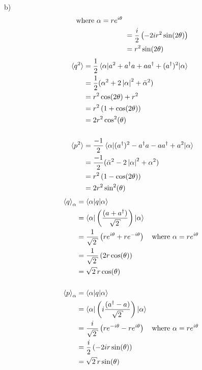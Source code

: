 \begin{homeworkProblem}[Problem 10]
\begin{homeworkSection}{b)}
\begin{align}
\text{\quad where $\alpha = r e^{i \theta}$ } \\
&= \frac{i}{2} \left( -2 i r^2 \sin(2\theta) \right) \\
&= r^{2} \sin(2\theta)
\end{align}
\begin{align}
   \braket{q^2} &= \frac{1}{2}
   \braket{\alpha |
   a^{2} + a^{\dagger}a + aa^{\dagger} + (a^{\dagger})^{2} | \alpha } \\
   &= \frac{1}{2}(\alpha^{2} + 2 \left| \alpha \right|^{2} + \bar{\alpha}^2 )\\
   &= r^{2} \cos(2\theta) + r^{2} \\
   &= r^{2} \left( 1 + \cos(2\theta) \right) \\
   &= 2 r^{2} \cos^{2}(\theta) \\ \nonumber \\
   \braket{p^2}
   &= \frac{-1}{2}
   \braket{\alpha |
   (a^\dagger)^{2} - a^{\dagger}a - aa^{\dagger} + a^{2} | \alpha } \\
   &= \frac{-1}{2}( \bar{\alpha}^2 - 2 \left| \alpha \right|^{2} + \alpha^{2}) \\
   &= r^{2} \left( 1 - \cos(2\theta) \right) \\
   &= 2 r^{2} \sin^{2}(\theta)
\end{align}
\begin{align} %
   \braket{q}_{\alpha} &= \braket{\alpha | q | \alpha} \\
                       &= \braket{\alpha |
   \left(\frac{(a+a^{\dagger})}{\sqrt{2}} \right)
| \alpha} \\
&= \frac{1}{\sqrt{2}} \left( r e^{i \theta} + r e^{- i \theta} \right)
\text{\quad where $\alpha = r e^{i \theta}$ } \\
&= \frac{1}{\sqrt{2}} \left( 2 r \cos(\theta) \right) \\
&= \sqrt{2} r  \cos(\theta) \\ \nonumber \\
\braket{p}_{\alpha} &= \braket{\alpha | q | \alpha} \\
                    &= \braket{\alpha |
\left(i\frac{(a^{\dagger}-a)}{\sqrt{2}} \right) | \alpha} \\
&= \frac{i}{\sqrt{2}} \left( r e^{-i \theta} - r e^{i \theta} \right)
\text{\quad where $\alpha = r e^{i \theta}$ } \\
&= \frac{i}{2} \left( - 2 i r \sin(\theta) \right) \\
&= \sqrt{2} r  \sin(\theta) \\ \nonumber \\

\end{align}
\end{homeworkSection}
\end{homeworkProblem}
